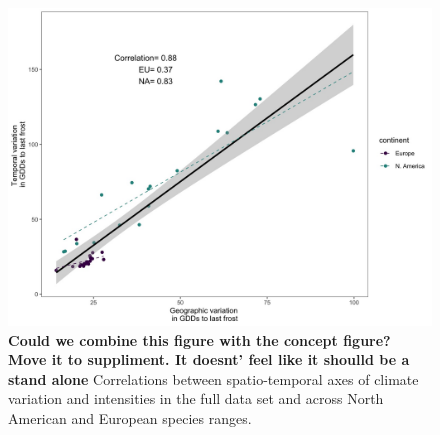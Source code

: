 \documentclass[12pt]{article}\usepackage[]{graphicx}\usepackage[]{color}
\begin{document}
\begin{figure}[h!]
    \centering
 \includegraphics[width=\textwidth]{..//..//analyses/ranges/figures/clim_params.jpeg} 
    \caption{\textbf{Could we combine this figure with the concept figure? Move it to suppliment. It doesnt' feel like it shoulld be a stand alone} Correlations between spatio-temporal axes of climate variation and intensities in the full data set and across North American and European species ranges.}%
    \label{fig:corrs}
\end{figure}
\end{document}
